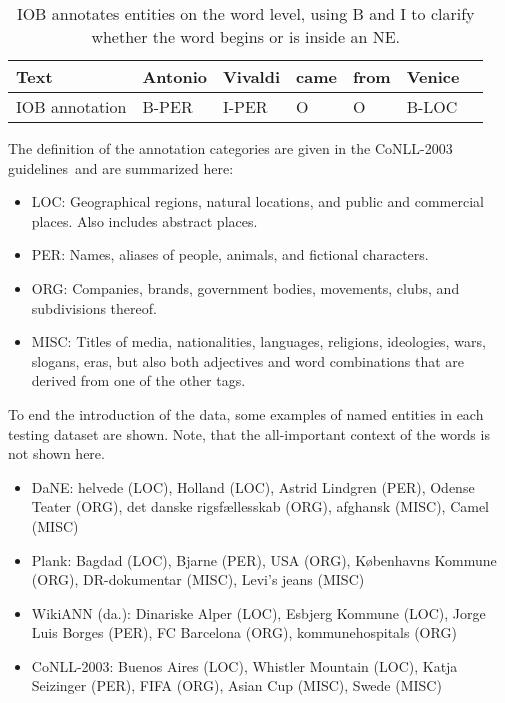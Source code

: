 \documentclass[main.tex]{subfiles}
\begin{document}
\begin{table}[H]
    \centering
    \begin{tabular}{l|llllll}
        Text              & Antonio & Vivaldi & came & from & Venice\\\hline
        IOB annotation    & B-PER   & I-PER   &  O   & O    & B-LOC   \\
    \end{tabular}
    \caption{
        IOB annotates entities on the word level, using B and I to clarify whether the word begins or is inside an NE.
    }
    \label{tab:iob-ex}
\end{table}\noindent
The definition of the annotation categories are given in the CoNLL-2003 guidelines\footnotemark~and are summarized here:
\begin{itemize}
    \item LOC: Geographical regions, natural locations, and public and commercial places. Also includes abstract places.
    \item PER: Names, aliases of people, animals, and fictional characters.
    \item ORG: Companies, brands, government bodies, movements, clubs, and subdivisions thereof.
    \item MISC: Titles of media, nationalities, languages, religions, ideologies, wars, slogans, eras, but also both adjectives and word combinations that are derived from one of the other tags.
\end{itemize}
To end the introduction of the data, some examples of named entities in each testing dataset are shown.
Note, that the all-important context of the words is not shown here.
\begin{itemize}
    \item DaNE: helvede (LOC), Holland (LOC), Astrid Lindgren (PER), Odense Teater (ORG), det danske rigsfællesskab (ORG), afghansk (MISC), Camel (MISC)
    \item Plank: Bagdad (LOC), Bjarne (PER), USA (ORG), Københavns Kommune (ORG), DR-dokumentar (MISC), Levi's jeans (MISC)
    \item WikiANN (da.): Dinariske Alper (LOC), Esbjerg Kommune (LOC), Jorge Luis Borges (PER), FC Barcelona (ORG), kommunehospitals (ORG)
    \item CoNLL-2003: Buenos Aires (LOC), Whistler Mountain (LOC), Katja Seizinger (PER),  FIFA (ORG), Asian Cup (MISC), Swede (MISC)
\end{itemize}
\end{document}
